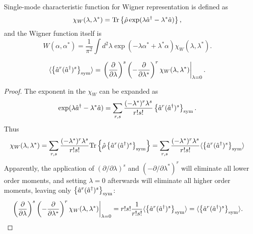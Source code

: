 Single-mode characteristic function for Wigner representation is defined as
\[
	\chi_W (\lambda, \lambda^*)
	= \mathrm{Tr} \left\{  \hat{\rho} \exp (\lambda \hat{a}^\dagger - \lambda^* \hat{a})  \right\},
\]
and the Wigner function itself is
\begin{equation}
\label{eqn:multimode-formalism:single-mode-wigner}
	W (\alpha, \alpha^*)
	= \frac{1}{\pi^2} \int d^2 \lambda \exp(-\lambda \alpha^* + \lambda^* \alpha)
		\chi_W (\lambda, \lambda^*).
\end{equation}

\begin{lemma}
\label{lmm:multimode-formalism:moments-from-chi}
\[
	\langle \left\{  \hat{a}^r (\hat{a}^\dagger)^s  \right\}_{\mathrm{sym}} \rangle
	= \left.
		\left( \frac{\partial}{\partial \lambda} \right)^s
		\left( -\frac{\partial}{\partial \lambda^*} \right)^r
		\chi_W (\lambda, \lambda^*)
	\right|_{\lambda=0}.
\]
\end{lemma}
\begin{proof}
The exponent in the $\chi_W$ can be expanded as
\[
	\exp (\lambda \hat{a}^\dagger - \lambda^* \hat{a})
	= \sum\limits_{r,s}
		\frac{(-\lambda^*)^r \lambda^s}{r!s!}
		\left\{  \hat{a}^r (\hat{a}^\dagger)^s  \right\}_{\mathrm{sym}}.
\]
Thus
\[
	\chi_W(\lambda, \lambda^*)
	= \sum\limits_{r,s}
		\frac{(-\lambda^*)^r \lambda^s}{r!s!}
		\mathrm{Tr} \left\{ 
			\hat{\rho} \left\{  \hat{a}^r (\hat{a}^\dagger)^s  \right\}_{\mathrm{sym}}
		 \right\}
	= \sum\limits_{r,s}
		\frac{(-\lambda^*)^r \lambda^s}{r!s!}
		\langle \left\{  \hat{a}^r (\hat{a}^\dagger)^s  \right\}_{\mathrm{sym}} \rangle
\]
Apparently, the application of $(\partial / \partial \lambda)^s$ and $(-\partial / \partial \lambda^*)^r$ will eliminate all lower order moments,
and setting $\lambda = 0$ afterwards will eliminate all higher order moments,
leaving only $\left\{  \hat{a}^r (\hat{a}^\dagger)^s  \right\}_{\mathrm{sym}}$:
\[
	\left.
		\left( \frac{\partial}{\partial \lambda} \right)^s
		\left( -\frac{\partial}{\partial \lambda^*} \right)^r
		\chi_W (\lambda, \lambda^*)
	\right|_{\lambda=0}
	= r! s! \frac{1}{r! s!}
		\langle \left\{  \hat{a}^r (\hat{a}^\dagger)^s  \right\}_{\mathrm{sym}} \rangle
	= \langle \left\{  \hat{a}^r (\hat{a}^\dagger)^s  \right\}_{\mathrm{sym}} \rangle.
	\qedhere
\]
\end{proof}

